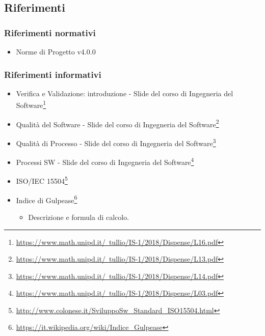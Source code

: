 \subsection{Riferimenti}
\label{sec:ref}
\subsubsection{Riferimenti normativi}
\begin{itemize}
	\item Norme di Progetto v4.0.0
\end{itemize}
\subsubsection{Riferimenti informativi}
\begin{itemize}
	\item
		Verifica e Validazione: introduzione - Slide del corso di Ingegneria del Software\footnote{\href{https://www.math.unipd.it/~tullio/IS-1/2018/Dispense/L16.pdf}{https://www.math.unipd.it/~tullio/IS-1/2018/Dispense/L16.pdf}}
	\item
		Qualità del Software - Slide del corso di Ingegneria del Software\footnote{\href{https://www.math.unipd.it/~tullio/IS-1/2018/Dispense/L13.pdf}{https://www.math.unipd.it/~tullio/IS-1/2018/Dispense/L13.pdf}}	
	\item
		Qualità di Processo - Slide del corso di Ingegneria del Software\footnote{\href{https://www.math.unipd.it/~tullio/IS-1/2018/Dispense/L14.pdf}{https://www.math.unipd.it/~tullio/IS-1/2018/Dispense/L14.pdf}}
	\item
		Processi SW - Slide del corso di Ingegneria del Software\footnote{\href{https://www.math.unipd.it/~tullio/IS-1/2018/Dispense/L03.pdf}{https://www.math.unipd.it/~tullio/IS-1/2018/Dispense/L03.pdf}}
	\item 
		ISO/IEC 15504\footnote{\href{http://www.colonese.it/SviluppoSw_Standard_ISO15504.html}{http://www.colonese.it/SviluppoSw\_{}Standard\_{}ISO15504.html}}
	\item 
		Indice di Gulpease\footnote{\href{https://it.wikipedia.org/wiki/Indice_Gulpease}{https://it.wikipedia.org/wiki/Indice\_{}Gulpease}}
		\begin{itemize}
			\item Descrizione e formula di calcolo.
		\end{itemize}
\end{itemize}
